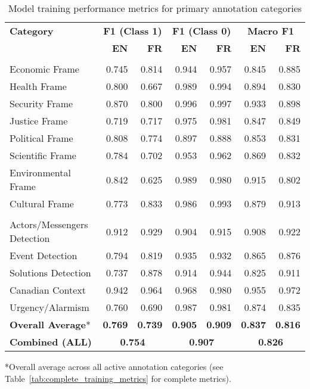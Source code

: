 \documentclass[12pt]{article}
\begin{document}
\begin{table}[b!]
\centering
\caption{Model training performance metrics for primary annotation categories}
\label{tab:performance}
\small
\begin{tabular}{l|rr|rr|rr}
\toprule
\rowcolor{gray!10}
\textbf{Category} & \multicolumn{2}{c}{\textbf{F1 (Class 1)}} & \multicolumn{2}{c}{\textbf{F1 (Class 0)}} & \multicolumn{2}{c}{\textbf{Macro F1}} \\
\cline{2-7}
\rowcolor{gray!10}
& \textbf{EN} & \textbf{FR} & \textbf{EN} & \textbf{FR} & \textbf{EN} & \textbf{FR} \\
\midrule
\rowcolor{gray!10}
\multicolumn{7}{l}{\textit{Thematic Frames}} \\
\midrule
Economic Frame & 0.745 & 0.814 & 0.944 & 0.957 & 0.845 & 0.885 \\
Health Frame & 0.800 & 0.667 & 0.989 & 0.994 & 0.894 & 0.830 \\
Security Frame & 0.870 & 0.800 & 0.996 & 0.997 & 0.933 & 0.898 \\
Justice Frame & 0.719 & 0.717 & 0.975 & 0.981 & 0.847 & 0.849 \\
Political Frame & 0.808 & 0.774 & 0.897 & 0.888 & 0.853 & 0.831 \\
Scientific Frame & 0.784 & 0.702 & 0.953 & 0.962 & 0.869 & 0.832 \\
Environmental Frame & 0.842 & 0.625 & 0.989 & 0.980 & 0.915 & 0.802 \\
Cultural Frame & 0.773 & 0.833 & 0.986 & 0.993 & 0.879 & 0.913 \\
\midrule
\rowcolor{gray!10}
\multicolumn{7}{l}{\textit{Other Primary Categories: Actors, Events and Solutions}} \\
\midrule
Actors/Messengers Detection & 0.912 & 0.929 & 0.904 & 0.915 & 0.908 & 0.922 \\
Event Detection & 0.794 & 0.819 & 0.935 & 0.932 & 0.865 & 0.876 \\
Solutions Detection & 0.737 & 0.878 & 0.914 & 0.944 & 0.825 & 0.911 \\
Canadian Context & 0.942 & 0.964 & 0.968 & 0.980 & 0.955 & 0.972 \\
Urgency/Alarmism & 0.760 & 0.690 & 0.987 & 0.981 & 0.874 & 0.835 \\
\midrule
\rowcolor{gray!15}
\textbf{Overall Average}* & \textbf{0.769} & \textbf{0.739} & \textbf{0.905} & \textbf{0.909} & \textbf{0.837} & \textbf{0.816} \\
\rowcolor{gray!15}
\textbf{Combined (ALL)} & \multicolumn{2}{c}{\textbf{0.754}} & \multicolumn{2}{c}{\textbf{0.907}} & \multicolumn{2}{c}{\textbf{0.826}} \\
\bottomrule
\end{tabular}

\vspace{0.3em}
\noindent\footnotesize
*Overall average across all active annotation categories (see Table~\ref{tab:complete_training_metrics} for complete metrics).
\end{table}
\end{document}
